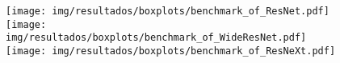 \begin{figure}[h!]
	\texttt{[image: img/resultados/boxplots/benchmark\_of\_ResNet.pdf]}
	\texttt{[image: img/resultados/boxplots/benchmark\_of\_WideResNet.pdf]}
	\texttt{[image: img/resultados/boxplots/benchmark\_of\_ResNeXt.pdf]}
	\caption{}
	\label{fig:Time_of_ResNet based}
\end{figure}

